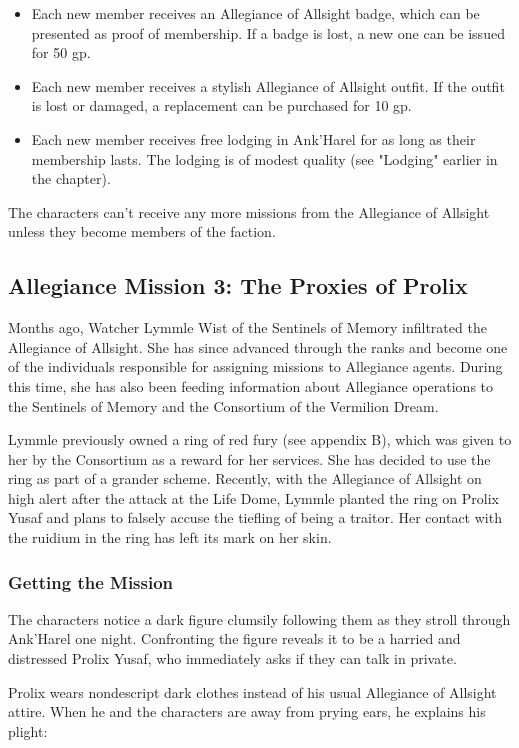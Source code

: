 \documentclass[10pt,a4paper,twoside,bg=print,twocolumn,openany,nodeprecatedcode]{dndbook}
\begin{document}
\begin{itemize}
\item Each new member receives an Allegiance of Allsight badge, which can be presented as proof of membership. If a badge is lost, a new one can be issued for 50 gp.
\item Each new member receives a stylish Allegiance of Allsight outfit. If the outfit is lost or damaged, a replacement can be purchased for 10 gp.
\item Each new member receives free lodging in Ank'Harel for as long as their membership lasts. The lodging is of modest quality (see "Lodging" earlier in the chapter).
\end{itemize}

The characters can't receive any more missions from the Allegiance of Allsight unless they become members of the faction.

\subsection{Allegiance Mission 3: The Proxies of Prolix}
Months ago, Watcher Lymmle Wist of the Sentinels of Memory infiltrated the Allegiance of Allsight. She has since advanced through the ranks and become one of the individuals responsible for assigning missions to Allegiance agents. During this time, she has also been feeding information about Allegiance operations to the Sentinels of Memory and the Consortium of the Vermilion Dream.

Lymmle previously owned a ring of red fury (see appendix B), which was given to her by the Consortium as a reward for her services. She has decided to use the ring as part of a grander scheme. Recently, with the Allegiance of Allsight on high alert after the attack at the Life Dome, Lymmle planted the ring on Prolix Yusaf and plans to falsely accuse the tiefling of being a traitor. Her contact with the ruidium in the ring has left its mark on her skin.

\subsubsection{Getting the Mission}
The characters notice a dark figure clumsily following them as they stroll through Ank'Harel one night. Confronting the figure reveals it to be a harried and distressed Prolix Yusaf, who immediately asks if they can talk in private.

Prolix wears nondescript dark clothes instead of his usual Allegiance of Allsight attire. When he and the characters are away from prying ears, he explains his plight:
\end{document}
